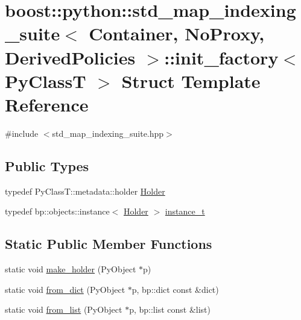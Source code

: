 \hypertarget{structboost_1_1python_1_1std__map__indexing__suite_1_1init__factory}{}\section{boost\+:\+:python\+:\+:std\+\_\+map\+\_\+indexing\+\_\+suite$<$ Container, No\+Proxy, Derived\+Policies $>$\+:\+:init\+\_\+factory$<$ Py\+Class\+T $>$ Struct Template Reference}
\label{structboost_1_1python_1_1std__map__indexing__suite_1_1init__factory}


{\ttfamily \#include $<$std\+\_\+map\+\_\+indexing\+\_\+suite.\+hpp$>$}

\subsection*{Public Types}
\begin{DoxyCompactItemize}
\item 
typedef Py\+Class\+T\+::metadata\+::holder \hyperlink{structboost_1_1python_1_1std__map__indexing__suite_1_1init__factory_a785b4c017210dd048b47eb6c04a5cdc6}{Holder}
\item 
typedef bp\+::objects\+::instance$<$ \hyperlink{structboost_1_1python_1_1std__map__indexing__suite_1_1init__factory_a785b4c017210dd048b47eb6c04a5cdc6}{Holder} $>$ \hyperlink{structboost_1_1python_1_1std__map__indexing__suite_1_1init__factory_aea2971d45c2f4de6ac83494b504d9a19}{instance\+\_\+t}
\end{DoxyCompactItemize}
\subsection*{Static Public Member Functions}
\begin{DoxyCompactItemize}
\item 
static void \hyperlink{structboost_1_1python_1_1std__map__indexing__suite_1_1init__factory_acd1c1789efbbb4f595abae51b1f0a2a0}{make\+\_\+holder} (Py\+Object $\ast$p)
\item 
static void \hyperlink{structboost_1_1python_1_1std__map__indexing__suite_1_1init__factory_aa1f0944f15cb284c240d25bfa6f0ccca}{from\+\_\+dict} (Py\+Object $\ast$p, bp\+::dict const \&dict)
\item 
static void \hyperlink{structboost_1_1python_1_1std__map__indexing__suite_1_1init__factory_ad0dbf8e2c1b8fa7dd7ecf87415e7d3fb}{from\+\_\+list} (Py\+Object $\ast$p, bp\+::list const \&list)
\end{DoxyCompactItemize}


